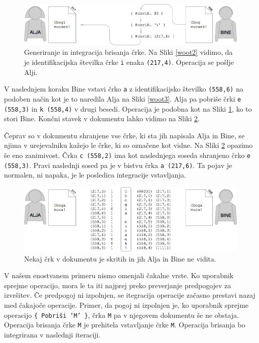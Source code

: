 \documentclass[a4paper, 12pt, twoside]{book}
\begin{document}
\begin{figure}[placement h]
\begin{center}
\includegraphics[width=13cm]{woot4.png}
\end{center}
\caption{Generiranje in integracija brisanja črke. Na Sliki \ref{woot2} vidimo, da je identifikacijska številka črke {\tt i} enaka {\tt (217,4)}. Operacija se pošlje Alji.}
\label{woot4}
\end{figure}

V naslednjem koraku Bine vstavi črko {\tt a} z identifikacijsko številko {\tt (558,6)} na podoben način kot je to naredila Alja na Sliki \ref{woot3}. Alja pa pobriše črki {\tt e (558,3)} in {\tt k (558,4)} v drugi besedi. Operacija je podobna kot na Sliki \ref{woot4}, ko to stori Bine. Končni stavek v dokumentu lahko vidimo na Sliki \ref{woot5}.

Čeprav so v dokumentu shranjene vse črke, ki sta jih napisala Alja in Bine, se njima v urejevalniku kažejo le črke, ki so označene kot vidne. Na Sliki \ref{woot5} opazimo še eno zanimivost. Črka {\tt c (558,2)} ima kot naslednjega soseda shranjeno črko {\tt e (558,3)}. Pravi naslednji sosed pa je v bistvu črka {\tt a (217,6)}. Ta pojav je normalen, ni napaka, je le posledica integracije vstavljanja.

\begin{figure}[placement h]
\begin{center}
\includegraphics[width=13cm]{woot5.png}
\end{center}
\caption{Nekaj črk v dokumentu je skritih in jih Alja in Bine ne vidita.}
\label{woot5}
\end{figure}

V našem enostvanem primeru nismo omenjali čakalne vrste. Ko uporabnik sprejme operacijo, mora le ta iti najprej preko preverjanje predpogojev za izvršitev. Če predpogoj ni izpolnjen, se itegracija operacije začasno prestavi nazaj med čakajoče operacije. Primer, da pogoj ni izpolnjen je, ko uporabnik sprejme operacijo {\tt \{ Pobriši ‘M’ \}}, črka {\tt M} pa v njegovem dokumentu še ne obstaja. Operacija brisanja črke {\tt M} je prehitela vstavljanje črke {\tt M}. Operacija brisanja bo integrirana v naslednji iteraciji.
\end{document}
